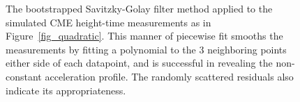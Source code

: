 \documentclass[structabstract]{aa}
\begin{document}
\begin{figure}[t]
\centering
{}
\caption{The bootstrapped Savitzky-Golay filter method applied to the simulated CME height-time measurements as in Figure~\ref{fig_quadratic}. This manner of piecewise fit smooths the measurements by fitting a polynomial to the 3 neighboring points either side of each datapoint, and is successful in revealing the non-constant acceleration profile. The randomly scattered residuals also indicate its appropriateness.}
\label{fig_savgol}
\end{figure}
\end{document}
